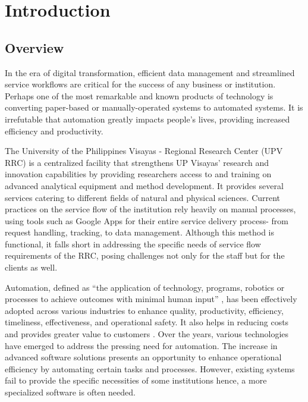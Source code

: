 \chapter{Introduction}
\label{sec:researchdesc}    %

\section{Overview}
\label{sec:overview}

In the era of digital transformation, efficient data management and streamlined service workflows are critical for the success of any business or institution. Perhaps one of the most remarkable and known products of technology is converting paper-based or manually-operated systems to automated systems. It is irrefutable that automation greatly impacts people's lives, providing increased efficiency and productivity.

The University of the Philippines Visayas - Regional Research Center (UPV RRC) is a centralized facility that strengthens UP Visayas’ research and innovation capabilities by providing researchers access to and training on advanced analytical equipment and method development. It provides several services catering to different fields of natural and physical sciences. Current practices on the service flow of the institution rely heavily on manual processes, using tools such as Google Apps for their entire service delivery process- from request handling, tracking, to data management. Although this method is functional, it falls short in addressing the specific needs of service flow requirements of the RRC, posing challenges not only for the staff but for the clients as well. 

Automation, defined as “the application of technology, programs, robotics or processes to achieve outcomes with minimal human input” \cite{ibm}, has been effectively adopted across various industries to enhance quality, productivity, efficiency, timeliness, effectiveness, and operational safety. It also helps in reducing costs and provides greater value to customers \cite{caban2021}. Over the years, various technologies have emerged to address the pressing need for automation. The increase in advanced software solutions presents an opportunity to enhance operational efficiency by automating certain tasks and processes. However, existing systems fail to provide the specific necessities of some institutions hence, a more specialized software is often needed. 

